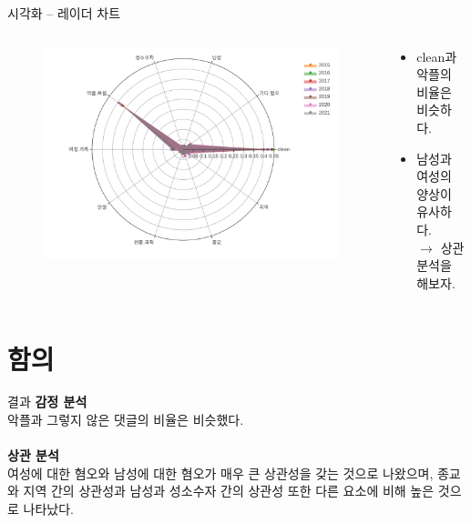 \documentclass[mathserif, aspectratio=169]{beamer}
\begin{document}
\begin{frame}{시각화 -- 레이더 차트}
    \begin{columns}
        \begin{column}{0.5\linewidth}
            \centering
            \begin{figure}
                \includegraphics[width = \linewidth]{images/radarchart.pdf}
            \end{figure}
        \end{column}
        \begin{column}{0.5\linewidth}
            \begin{itemize}
                \item clean과 악플의 비율은 비슷하다.
                \item 남성과 여성의 양상이 유사하다.\\$\rightarrow$ 상관분석을 해보자.
            \end{itemize}
        \end{column}
    \end{columns}
\end{frame}
\section{함의}
\begin{frame}{결과}
    \justifying
    \textbf{감정 분석}\\
    악플과 그렇지 않은 댓글의 비율은 비슷했다.\\~\\
    \textbf{상관 분석}\\
    여성에 대한 혐오와 남성에 대한 혐오가 매우 큰 상관성을 갖는 것으로 나왔으며, 
    종교와 지역 간의 상관성과 남성과 성소수자 간의 상관성 또한 다른 요소에 비해
    높은 것으로 나타났다.\\
\end{frame}
\end{document}

